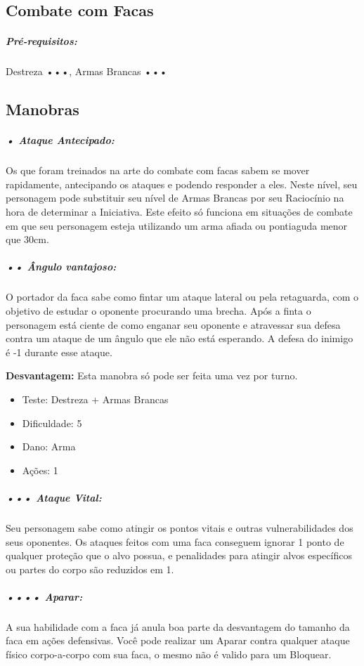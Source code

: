 
\subsection{\bf Combate com Facas}

\subparagraph*{\bf Pré-requisitos:} Destreza •••, Armas Brancas •••

\subsection{\bf Manobras}

\subparagraph{\bf • Ataque Antecipado:}
Os que foram treinados na arte do combate com facas sabem se mover rapidamente, antecipando os ataques e podendo responder a eles. Neste nível, seu personagem pode substituir seu nível de Armas Brancas por seu Raciocínio na hora de determinar a Iniciativa. Este efeito só funciona em situações de combate em que seu personagem esteja utilizando um arma afiada ou pontiaguda menor que 30cm.

\subparagraph{\bf •• Ângulo vantajoso:}
O portador da faca sabe como fintar um ataque lateral ou pela retaguarda, com o objetivo de estudar o oponente procurando uma brecha. Após a finta o personagem está ciente de como enganar seu oponente e atravessar sua defesa contra um ataque de um ângulo que ele não está esperando. A defesa do inimigo é -1 durante esse ataque.

{\bf Desvantagem:} Esta manobra só pode ser feita uma vez por turno.

\begin{itemize}[noitemsep]
\item Teste: Destreza + Armas Brancas
\item Dificuldade: 5
\item Dano: Arma
\item Ações: 1
\end{itemize}

\subparagraph{\bf ••• Ataque Vital:}
Seu personagem sabe como atingir os pontos vitais e outras vulnerabilidades dos seus oponentes. Os ataques feitos com uma faca conseguem ignorar 1 ponto de qualquer proteção que o alvo possua, e penalidades para atingir alvos específicos ou partes do corpo são reduzidos em 1.

\subparagraph{\bf •••• Aparar:} 
A sua habilidade com a faca já anula boa parte da desvantagem do tamanho da faca em ações defensivas. Você pode realizar um Aparar contra qualquer ataque físico corpo-a-corpo com sua faca, o mesmo não é valido para um Bloquear.

